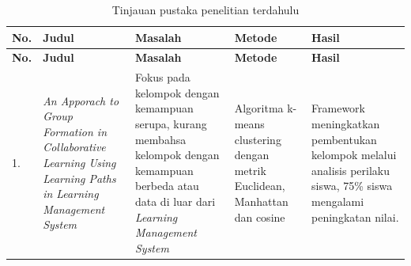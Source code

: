 \begin{longtable}{| b{}|p{}|p{}|p{}|p{}|} %
	\caption{Tinjauan pustaka penelitian terdahulu}
	\label{table:2.literasi}                                                                                                                                                                                                                                                                                                                                                                                                                                                                                                                                            \\
	\hline
	\textbf{No.} & \textbf{Judul}                                                                                                                    & \textbf{Masalah}                                                                                                                                           & \textbf{Metode}                                                                                                         & \textbf{Hasil}                                                                                                            \\
	\hline
	\endfirsthead %
	\hline
	\textbf{No.} & \textbf{Judul}                                                                                                                    & \textbf{Masalah}                                                                                                                                           & \textbf{Metode}                                                                                                         & \textbf{Hasil}                                                                                                            \\
	\hline
	\endhead %
	1.           & \textit {An Apporach to Group Formation in Collaborative Learning Using Learning Paths in Learning Management System}             & Fokus pada kelompok dengan kemampuan serupa, kurang membahsa kelompok dengan kemampuan berbeda atau data di luar dari \textit {Learning Management System} & Algoritma k-means clustering dengan metrik Euclidean, Manhattan dan cosine                                              & Framework meningkatkan pembentukan kelompok melalui analisis perilaku siswa, 75\% siswa mengalami peningkatan nilai.      \\

\end{longtable}
